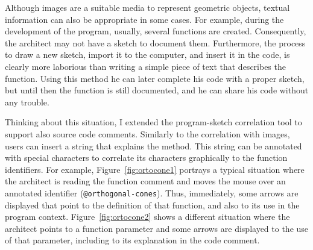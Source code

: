 \begin{figure}[!h]
\begin{minipage}[t]{.495\textwidth}
  \label{fig:figmeaning}
\end{minipage}
\end{figure}

Although images are a suitable media to represent geometric objects, textual information can also be appropriate in some cases. For example, 
during the development of the program, usually, several functions are created. Consequently, the architect may not have a sketch to document them. Furthermore, the process to draw a new sketch, import it to the computer, and insert it in the code, is clearly more laborious than writing a simple piece of text that describes the function. Using this method he can later complete his code with a proper sketch, but until then the function is still documented, and he can share his code without any trouble.

Thinking about this situation, I extended the program-sketch correlation tool to support also source code comments. Similarly to the correlation with images, users can insert a string that explains the method. This string can be annotated with special characters to correlate its characters graphically to the function identifiers. For example, Figure~\ref{fig:ortocone1} portrays a typical situation where the architect is reading the function comment and moves the mouse over an annotated identifier (\texttt{@orthogonal-cones}). Thus, immediately, some arrows are displayed that point to the definition of that function, and also to its use in the program context. Figure~\ref{fig:ortocone2} shows a different situation where the architect points to a function parameter and some arrows are displayed to the use of that parameter, including to its explanation in the code comment. 


